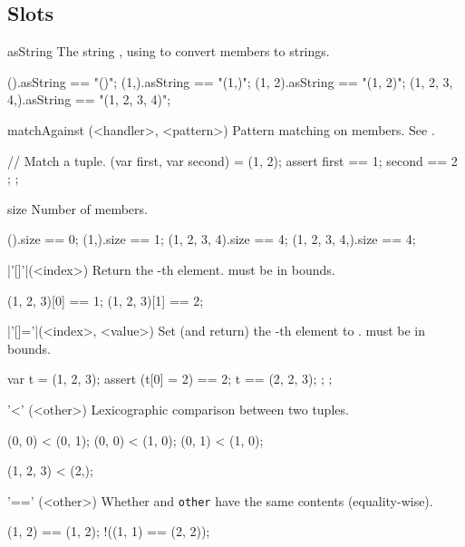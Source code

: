 \subsection{Slots}
\begin{urbiscriptapi}
\item[asString]%
  The string , using
   to convert members to strings.

\begin{urbiassert}
           ().asString == "()";
         (1,).asString == "(1,)";
       (1, 2).asString == "(1, 2)";
(1, 2, 3, 4,).asString == "(1, 2, 3, 4)";
\end{urbiassert}


\item[matchAgainst](<handler>, <pattern>)%
  Pattern matching on members.  See .
\begin{urbiscript}
{
  // Match a tuple.
  (var first, var second) = (1, 2);
  assert { first == 1; second == 2 };
};
\end{urbiscript}

\item[size] Number of members.
\begin{urbiassert}
           ().size == 0;
         (1,).size == 1;
 (1, 2, 3, 4).size == 4;
(1, 2, 3, 4,).size == 4;
\end{urbiassert}

\item|'[]'|(<index>)%
  Return the -th element.   must be in bounds.
\begin{urbiassert}
(1, 2, 3)[0] == 1;
(1, 2, 3)[1] == 2;
\end{urbiassert}

\item|'[]='|(<index>, <value>)%
  Set (and return) the -th element to .
   must be in bounds.
\begin{urbiscript}
{
  var t = (1, 2, 3);
  assert
  {
    (t[0] = 2) == 2;
    t == (2, 2, 3);
  };
};
\end{urbiscript}

\item['<'](<other>)%
  Lexicographic comparison between two tuples.
\begin{urbiassert}
(0, 0) < (0, 1);
(0, 0) < (1, 0);
(0, 1) < (1, 0);

(1, 2, 3) < (2,);
\end{urbiassert}

\item['=='](<other>)%
  Whether \this and \lstinline|other| have the same contents
  (equality-wise).
\begin{urbiassert}
  (1, 2) == (1, 2);
!((1, 1) == (2, 2));
\end{urbiassert}


\end{urbiscriptapi}
